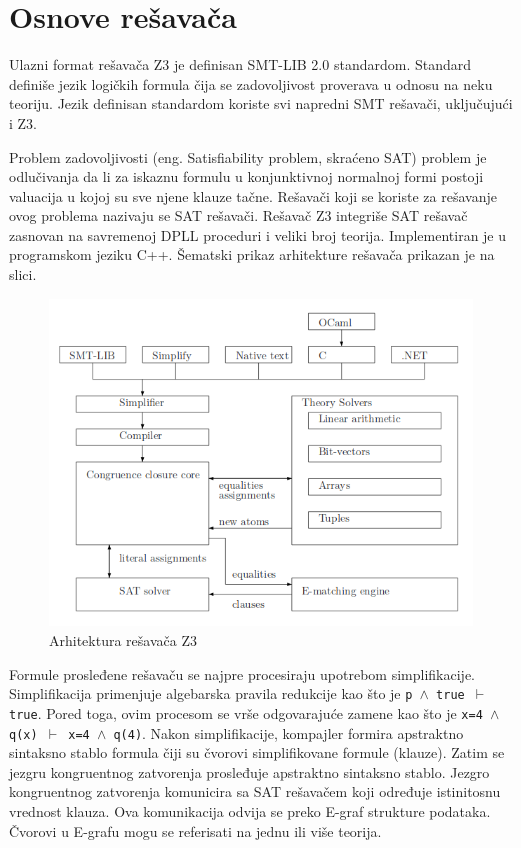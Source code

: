 \documentclass[12pt,oneside]{memoir}
\begin{document}
\section{Osnove rešavača}  \label{sec:num1}
Ulazni format rešavača Z3 je definisan SMT-LIB 2.0 standardom. Standard definiše jezik logičkih formula čija se zadovoljivost proverava u odnosu na neku teoriju. Jezik definisan standardom koriste svi napredni SMT rešavači, uključujući i Z3. 
\par
Problem zadovoljivosti (eng. Satisfiability problem, skraćeno SAT) problem je odlučivanja da li za iskaznu formulu u konjunktivnoj normalnoj formi postoji valuacija u kojoj su sve njene klauze tačne.
Rešavači koji se koriste za rešavanje ovog problema nazivaju se SAT rešavači. Rešavač Z3 integriše SAT rešavač zasnovan na savremenoj DPLL proceduri i veliki broj teorija. 
Implementiran je u programskom jeziku C++. Šematski prikaz arhitekture rešavača prikazan je na slici. 
\begin{figure}[!ht]
  \centering
  \includegraphics[width=1\textwidth]{arhitektura.png}
  \caption{Arhitektura rešavača Z3}
  \label{fig:arhitektura}
\end{figure}
\par
Formule prosleđene rešavaču se najpre procesiraju upotrebom simplifikacije. Simplifikacija primenjuje algebarska pravila redukcije kao što je \texttt{p $\land$ true $\vdash$ true}. Pored toga, ovim procesom se vrše odgovarajuće zamene kao što je \texttt{x=4 $\land$ q(x) $\vdash$ x=4 $\land$ q(4)}.
Nakon simplifikacije, kompajler formira apstraktno sintaksno stablo formula čiji su čvorovi simplifikovane formule (klauze). Zatim se jezgru kongruentnog zatvorenja prosleđuje apstraktno sintaksno stablo. Jezgro kongruentnog zatvorenja komunicira sa SAT rešavačem koji određuje istinitosnu vrednost klauza. Ova komunikacija odvija se preko E-graf strukture podataka. Čvorovi u E-grafu mogu se referisati na jednu ili više teorija.
\end{document}
